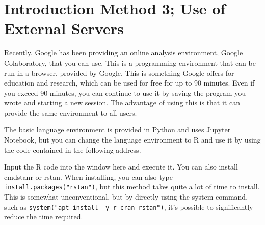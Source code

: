 \documentclass{ltjsbook}
\begin{document}
\section{Introduction Method 3; Use of External Servers}

Recently, Google has been providing an online analysis environment, Google Colaboratory, that you can use.
This is a programming environment that can be run in a browser, provided by Google. This is something Google offers for education and research, which can be used for free for up to 90 minutes. Even if you exceed 90 minutes, you can continue to use it by saving the program you wrote and starting a new session. The advantage of using this is that it can provide the same environment to all users.

The basic language environment is provided in Python and uses Jupyter Notebook, but you can change the language environment to R and use it by using the code contained in the following address.


Input the R code into the window here and execute it. You can also install cmdstanr or rstan.
When installing, you can also type \verb|install.packages("rstan")|, but this method takes quite a lot of time to install.
This is somewhat unconventional, but by directly using the system command, such as \verb|system("apt install -y r-cran-rstan")|, it's possible to significantly reduce the time required.
\end{document}
